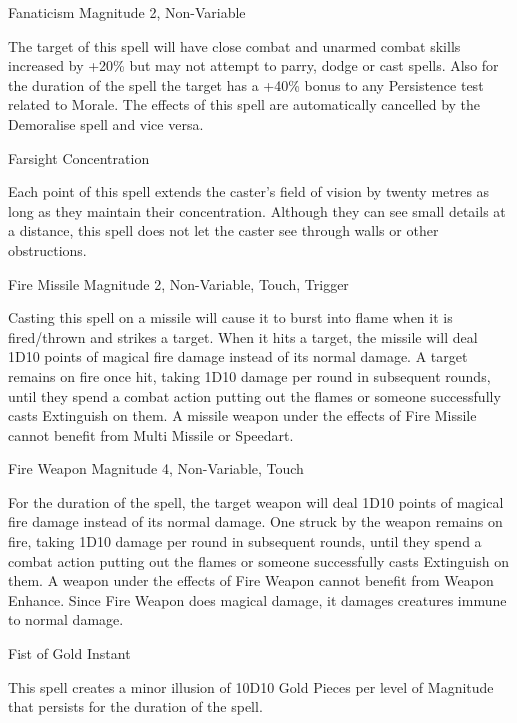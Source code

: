 \begin{rpg-spell}
{Fanaticism}
{Magnitude 2, Non-Variable}

The target of this spell will have close combat and unarmed combat skills increased by +20\% but may not attempt to parry, dodge or cast spells. Also for the duration of the spell the target has a +40\% bonus to any Persistence test related to Morale. The effects of this spell are automatically cancelled by the Demoralise spell and vice versa.
\end{rpg-spell}


\begin{rpg-spell}
{Farsight}
{Concentration}

Each point of this spell extends the caster’s field of vision by twenty metres as long as they maintain their concentration. Although they can see small details at a distance, this spell does not let the caster see through walls or other obstructions.
\end{rpg-spell}


\begin{rpg-spell}
{Fire Missile}
{Magnitude 2, Non-Variable, Touch, Trigger}

Casting this spell on a missile will cause it to burst into flame when it is fired/thrown and strikes a target. When it hits a target, the missile will deal 1D10 points of magical fire damage instead of its normal damage. A target remains on fire once hit, taking 1D10 damage per round in subsequent rounds, until they spend a combat action putting out the flames or someone successfully casts Extinguish on them. A missile weapon under the effects of Fire Missile cannot benefit from Multi Missile or Speedart. 
\end{rpg-spell}


\begin{rpg-spell}
{Fire Weapon}
{Magnitude 4, Non-Variable, Touch}

For the duration of the spell, the target weapon will deal 1D10 points of magical fire damage instead of its normal damage. One struck by the weapon remains on fire, taking 1D10 damage per round in subsequent rounds, until they spend a combat action putting out the flames or someone successfully casts Extinguish on them. A weapon under the effects of Fire Weapon cannot benefit from Weapon Enhance. Since Fire Weapon does magical damage, it damages creatures immune to normal damage.
\end{rpg-spell}


\begin{rpg-spell}
{Fist of Gold}
{Instant}

This spell creates a minor illusion of 10D10 Gold Pieces per level of Magnitude that persists for the duration of the spell.
\end{rpg-spell}


